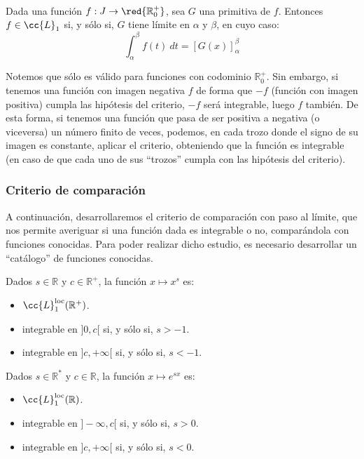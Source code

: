 \begin{teo}\ \\
    Dada una función $f:J\rightarrow\red{\mathbb{R}^+_0}$, sea $G$ una primitiva de $f$. Entonces $f\in \cc{L}_1$ si, y sólo si, $G$ tiene límite en $\alpha$ y $\beta$, en cuyo caso:
    \begin{equation*}
        \displaystyle\int_{\alpha}^{\beta} f(t)~dt  = {[G(x)]}_\alpha^\beta
    \end{equation*}
\end{teo}
Notemos que sólo es válido para funciones con codominio $\mathbb{R}^+_0$. Sin embargo, si tenemos una función con imagen negativa $f$ de forma que $-f$ (función con imagen positiva) cumpla las hipótesis del criterio, $-f$ será integrable, luego $f$ también. De esta forma, si tenemos una función que pasa de ser positiva a negativa (o viceversa) un número finito de veces, podemos, en cada trozo donde el signo de su imagen es constante, aplicar el criterio, obteniendo que la función es integrable (en caso de que cada uno de sus ``trozos'' cumpla con las hipótesis del criterio).

\subsubsection{Criterio de comparación}
A continuación, desarrollaremos el criterio de comparación con paso al límite, que nos permite averiguar si una función dada es integrable o no, comparándola con funciones conocidas. Para poder realizar dicho estudio, es necesario desarrollar un ``catálogo'' de funciones conocidas.

\begin{ejercicio*}
    Dados $s\in \mathbb{R}$ y $c\in \mathbb{R}^+$, la función $x\mapsto x^s$ es:
    \begin{itemize}
        \item $\cc{L}_1^{\text{loc}}(\mathbb{R}^+)$.
        \item integrable en $]0,c[$ si, y sólo si, $s > -1$.
        \item integrable en $]c,+\infty[$ si, y sólo si, $s < -1$.
    \end{itemize}
\end{ejercicio*}

\begin{ejercicio*}
    Dados $s\in \mathbb{R}^*$ y $c\in \mathbb{R}$, la función $x\mapsto e^{sx}$ es:
    \begin{itemize}
        \item $\cc{L}_1^{\text{loc}}(\mathbb{R})$.
        \item integrable en $]-\infty, c[$ si, y sólo si, $s>0$.
        \item integrable en $]c, +\infty[$ si, y sólo si, $s<0$.
    \end{itemize}
\end{ejercicio*}


